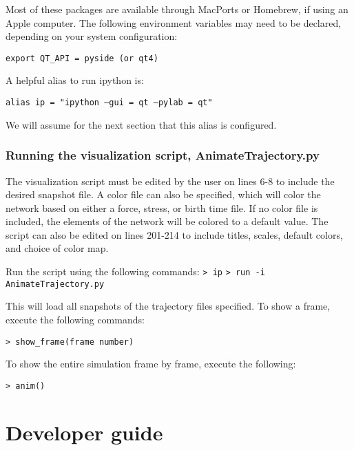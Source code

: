 \documentclass[11pt, oneside]{article}   	%
\begin{document}
\noindent Most of these packages are available through MacPorts or Homebrew, if using an Apple computer. The following environment variables
may need to be declared, depending on your system configuration:\newline

\texttt{export QT\_API = pyside (or qt4)}\newline

\noindent A helpful alias to run ipython is:\newline

\texttt{alias ip = "ipython --gui = qt --pylab = qt"}\newline

\noindent We will assume for the next section that this alias is configured.


\subsubsection{Running the visualization script, AnimateTrajectory.py}

The visualization script must be edited by the user on lines 6-8 to include the desired snapshot file. A color file can also be specified, which will color the network based on either a force, stress, or birth time file. If no color file is included, the elements of the network will be colored to a default value. The script can also be edited on lines 201-214 to include titles, scales, default colors, and choice of color map. \newline

\noindent Run the script using the following commands:\newline\newline
\indent\texttt{> ip}\newline
\indent\texttt{> run -i AnimateTrajectory.py}\newline

\noindent This will load all snapshots of the trajectory files specified. To show a frame, execute the following commands:\newline

\texttt{> show\_frame(frame number)}\newline

\noindent To show the entire simulation frame by frame, execute the following:\newline

\texttt{> anim()}

\section{Developer guide}
\end{document}
